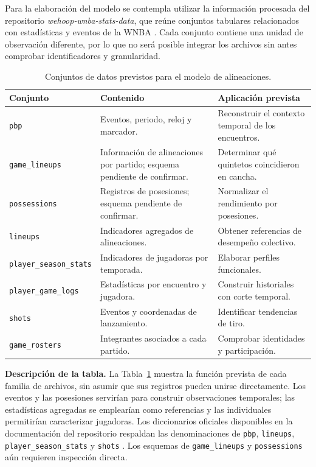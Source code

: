 Para la elaboración del modelo se contempla utilizar la información procesada del repositorio \textit{wehoop-wnba-stats-data}, que reúne conjuntos tabulares relacionados con estadísticas y eventos de la WNBA \cite{wehoopRepositorio}. Cada conjunto contiene una unidad de observación diferente, por lo que no será posible integrar los archivos sin antes comprobar identificadores y granularidad.

\begin{table}[htbp]
\centering
\small
\renewcommand{\arraystretch}{1.18}
\caption{Conjuntos de datos previstos para el modelo de alineaciones.}
\label{tab:fuentes_wehoop}
\begin{tabularx}{\textwidth}{@{}p{3.2cm}XX@{}}
\toprule
\textbf{Conjunto} & \textbf{Contenido} & \textbf{Aplicación prevista}\\
\midrule
\texttt{pbp} & Eventos, periodo, reloj y marcador. & Reconstruir el contexto temporal de los encuentros.\\
\texttt{game\_lineups} & Información de alineaciones por partido; esquema pendiente de confirmar. & Determinar qué quintetos coincidieron en cancha.\\
\texttt{possessions} & Registros de posesiones; esquema pendiente de confirmar. & Normalizar el rendimiento por posesiones.\\
\texttt{lineups} & Indicadores agregados de alineaciones. & Obtener referencias de desempeño colectivo.\\
\texttt{player\_season\_stats} & Indicadores de jugadoras por temporada. & Elaborar perfiles funcionales.\\
\texttt{player\_game\_logs} & Estadísticas por encuentro y jugadora. & Construir historiales con corte temporal.\\
\texttt{shots} & Eventos y coordenadas de lanzamiento. & Identificar tendencias de tiro.\\
\texttt{game\_rosters} & Integrantes asociados a cada partido. & Comprobar identidades y participación.\\
\bottomrule
\end{tabularx}
\end{table}

\noindent\textbf{Descripción de la tabla.}
La Tabla~\ref{tab:fuentes_wehoop} muestra la función prevista de cada familia de archivos, sin asumir que sus registros pueden unirse directamente. Los eventos y las posesiones servirían para construir observaciones temporales; las estadísticas agregadas se emplearían como referencias y las individuales permitirían caracterizar jugadoras. Los diccionarios oficiales disponibles en la documentación del repositorio respaldan las denominaciones de \texttt{pbp}, \texttt{lineups}, \texttt{player\_season\_stats} y \texttt{shots} \cite{wehoopPbp,wehoopLineups,wehoopPlayerSeason,wehoopShots}. Los esquemas de \texttt{game\_lineups} y \texttt{possessions} aún requieren inspección directa.